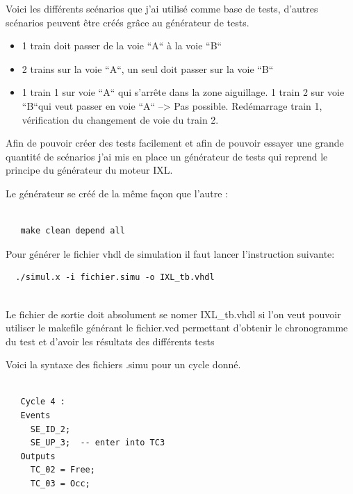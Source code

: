 Voici les différents scénarios que j'ai utilisé comme base de tests,
d'autres scénarios peuvent être créés  grâce au générateur de tests.

\medskip

\begin{itemize}
    \item 1 train doit passer de la voie ``A`` à la voie ``B``
    \item 2 trains sur la voie ``A``, un seul doit passer sur la voie ``B``
    \item 1 train 1 sur voie ``A`` qui s'arrête dans la zone aiguillage.
          1 train 2 sur voie ``B``qui veut passer en voie ``A`` --> Pas
          possible. Red\'emarrage train 1, v\'erification du
          changement  de voie du train 2.
\end{itemize}

\medskip

Afin de pouvoir créer des tests facilement et afin de pouvoir essayer une
grande quantité de scénarios j'ai mis en place un générateur de tests
qui reprend le principe du générateur du moteur IXL.

\smallskip

Le générateur se créé de la même façon que l'autre :

\begin{lstlisting}

   make clean depend all

\end{lstlisting}
  
\newpage

Pour générer le fichier vhdl de simulation il faut lancer l'instruction suivante:
\begin{lstlisting}
  ./simul.x -i fichier.simu -o IXL_tb.vhdl
  
\end{lstlisting}

\medskip

Le fichier de sortie doit absolument se nomer IXL\_tb.vhdl si l'on
veut pouvoir utiliser le makefile générant le fichier.vcd permettant
d'obtenir le chronogramme du test et d'avoir les résultats des
différents tests

\medskip

Voici la syntaxe des fichiers .simu pour un cycle donné.

\begin{lstlisting}

   Cycle 4 :
   Events
     SE_ID_2;  
     SE_UP_3;  -- enter into TC3	
   Outputs
     TC_02 = Free;
     TC_03 = Occ;  

\end{lstlisting}


